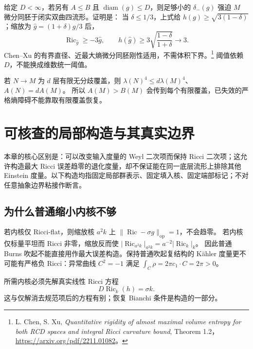 \documentclass[UTF8,fontset=fandol,zihao=-4,oneside,openany]{ctexbook}
\theoremstyle{cjkplain}
\numberwithin{equation}{chapter}
\DeclareMathOperator{\Ric}{Ric}
\begin{document}
给定 \(D<\infty\)，若另有 \(A\le B\) 且 \(\operatorname{diam}(g)\le D\)，则足够小的 \(\delta_-(g)\) 强迫 \(M\) 微分同胚于闭实双曲四流形。证明是：
当 \(\delta\le1/3\)，上式给 \(h(g)\ge\sqrt{3(1-\delta)}\)；缩放为
\(\widehat g=(1+\delta)g/3\) 后，
\[
\Ric_{\widehat g}\ge-3\widehat g,\qquad
h(\widehat g)\ge3\sqrt{\frac{1-\delta}{1+\delta}}\to3.
\]
Chen--Xu 的有界直径、近最大熵微分同胚刚性适用，不需体积下界。\footnote{L. Chen, S. Xu, \emph{Quantitative rigidity of almost maximal volume entropy for both RCD spaces and integral Ricci curvature bound}, Theorem 1.2，\url{https://arxiv.org/pdf/2211.01082}。}
阈值依赖 \(D\)，不能换成维数统一阈值。

若 \(N\to M\) 为 \(d\) 层有限无分歧覆盖，则
\(\lambda(N)^4\le d\lambda(M)^4\)、\(A(N)=dA(M)\)。
所以 \(A(M)>B(M)\) 会传到每个有限覆盖，已失效的严格熵障碍不能靠取有限覆盖恢复。

\chapter{可核查的局部构造与其真实边界}\label{FND:constructionchapter}
本章的核心区别是：可以改变输入度量的 Weyl 二次项而保持 Ricci 二次项；这允许构造最大 Ricci 误差趋零的退化度量，却不保证能在同一底层流形上排除其他 Einstein 度量。以下构造均指固定局部群表示、固定填入核、固定端部标记；不对任意抽象边界粘接作断言。

\section{为什么普通缩小内核不够}
若内核仅 Ricci-flat，则缩放核 \(a^2k\) 上
\(\|\Ric-\sigma g\|_{\operatorname{op}}=1\)，不会趋零。
若内核仅标量平坦而 Ricci 非零，缩放反而使
\(|\Ric_{a^2k}|_{a^2k}=a^{-2}|\Ric_k|_k\)。
因此普通 Burns 吹起不能直接用作最大误差构造。保持普通吹起复结构的 Kähler 度量更不可能有严格负 Ricci：异常曲线 \(C^2=-1\) 满足
\(\int_C\rho=2\pi c_1\cdot C=2\pi>0\)。

所需内核必须先解真实线性 Ricci 方程
\begin{equation}\label{FND:innerlinear}
D\Ric_k(h)=\sigma k.
\end{equation}
这与仅解消去规范项后的方程有别；恢复 Bianchi 条件是构造的一部分。
\end{document}
